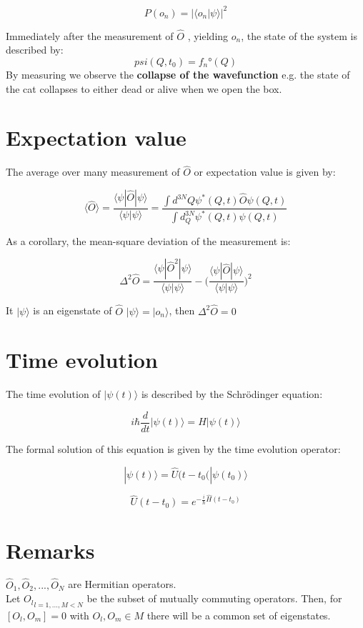 $$P(o_n) = |\langle o_n|\psi\rangle|^2$$

Immediately after the measurement of $\hat{O}$ , yielding $o_n$, the state of the system is described by:
$$psi(Q,t_0)=f_n°(Q)$$
By measuring we observe the \textbf{collapse of the wavefunction} e.g. the state of the cat collapses to either dead or alive when we open the box.

\section{Expectation value}
The average over many measurement of $\hat{O}$ or expectation value is given by:

$$\langle \hat{O}\rangle = \frac{\langle\psi|\hat{O}|\psi\rangle}{\langle \psi|\psi\rangle}=\frac{\int d^{3 N} Q \psi^{*}(Q, t) \hat{O} \psi(Q, t)}{\int d_{Q}^{3 N} \psi^{*}(Q, t) \psi(Q, t)}$$

As a corollary,  the mean-square deviation of the measurement is:

$$\Delta^2\hat{O} = \frac{\langle \psi|\hat{O}^2|\psi\rangle}{\langle\psi|\psi\rangle}-\biggl(\frac{\langle\psi|\hat{O}|\psi\rangle}{\langle\psi|\psi\rangle}\biggr)^2$$

It $|\psi\rangle$ is an eigenstate of $\hat{O}$ $|\psi\rangle = |o_n\rangle$, then $\Delta^2\hat{O} = 0$

\section{Time evolution}
The time evolution of $|\psi(t)\rangle$ is described by the Schr\"odinger equation:

$$i\hbar \frac{d{}}{d{t}}|\psi(t)\rangle = H|\psi(t)\rangle$$

The formal solution of this equation is given by the time evolution operator:

$$|\psi(t)\rangle = \hat{U}(t-t_0(|\psi(t_0)\rangle$$

$$\hat{U}(t-t_0) = e^{-\frac{i}{\hbar}\hat{H}(t-t_0)}$$

\section{Remarks}
$\hat{O}_1,\hat{O}_2,...,\hat{O}_N$ are Hermitian operators.\\
Let ${O_l}_{l=1,...,M<N}$ be the subset of mutually commuting operators. Then, for $[O_l,O_m]=0$ with $O_l,O_m \in M$ there will be a common set of eigenstates.\\
\noindent

